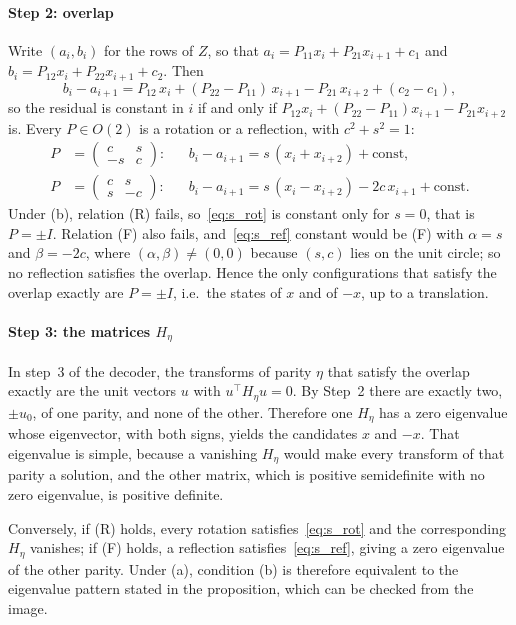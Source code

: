 \documentclass[preprint,12pt]{elsarticle}
\begin{document}
\paragraph{Step 2: overlap}
Write $(a_i,b_i)$ for the rows of $Z$, so that $a_i=P_{11}x_i+P_{21}x_{i+1}+c_1$ and $b_i=P_{12}x_i+P_{22}x_{i+1}+c_2$. Then
\begin{equation}\label{eq:s_residual}
b_i-a_{i+1}=P_{12}\,x_i+(P_{22}-P_{11})\,x_{i+1}-P_{21}\,x_{i+2}+(c_2-c_1),
\end{equation}
so the residual is constant in $i$ if and only if $P_{12}x_i+(P_{22}-P_{11})x_{i+1}-P_{21}x_{i+2}$ is. Every $P\in O(2)$ is a rotation or a reflection, with $c^2+s^2=1$:
\begin{align}
P&=\begin{pmatrix}c&s\\-s&c\end{pmatrix}:&& b_i-a_{i+1}=s\,(x_i+x_{i+2})+\text{const},\label{eq:s_rot}\\
P&=\begin{pmatrix}c&s\\s&-c\end{pmatrix}:&& b_i-a_{i+1}=s\,(x_i-x_{i+2})-2c\,x_{i+1}+\text{const}.\label{eq:s_ref}
\end{align}
Under (b), relation (R) fails, so~\eqref{eq:s_rot} is constant only for $s=0$, that is $P=\pm I$. Relation (F) also fails, and~\eqref{eq:s_ref} constant would be (F) with $\alpha=s$ and $\beta=-2c$, where $(\alpha,\beta)\neq(0,0)$ because $(s,c)$ lies on the unit circle; so no reflection satisfies the overlap. Hence the only configurations that satisfy the overlap exactly are $P=\pm I$, i.e.\ the states of $x$ and of $-x$, up to a translation.

\paragraph{Step 3: the matrices $H_\eta$}
In step~3 of the decoder, the transforms of parity $\eta$ that satisfy the overlap exactly are the unit vectors $u$ with $u^\top H_\eta u=0$. By Step~2 there are exactly two, $\pm u_0$, of one parity, and none of the other. Therefore one $H_\eta$ has a zero eigenvalue whose eigenvector, with both signs, yields the candidates $x$ and $-x$. That eigenvalue is simple, because a vanishing $H_\eta$ would make every transform of that parity a solution, and the other matrix, which is positive semidefinite with no zero eigenvalue, is positive definite.

Conversely, if (R) holds, every rotation satisfies~\eqref{eq:s_rot} and the corresponding $H_\eta$ vanishes; if (F) holds, a reflection satisfies~\eqref{eq:s_ref}, giving a zero eigenvalue of the other parity. Under (a), condition (b) is therefore equivalent to the eigenvalue pattern stated in the proposition, which can be checked from the image.
\end{document}
